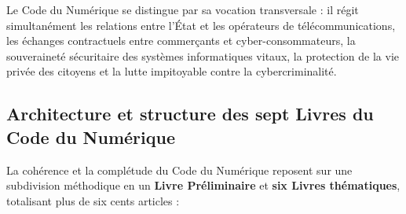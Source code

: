 Le Code du Numérique se distingue par sa vocation transversale : il régit simultanément les relations entre l'État et les opérateurs de télécommunications, les échanges contractuels entre commerçants et cyber-consommateurs, la souveraineté sécuritaire des systèmes informatiques vitaux, la protection de la vie privée des citoyens et la lutte impitoyable contre la cybercriminalité.

\subsection{Architecture et structure des sept Livres du Code du Numérique}

La cohérence et la complétude du Code du Numérique reposent sur une subdivision méthodique en un \textbf{Livre Préliminaire} et \textbf{six Livres thématiques}, totalisant plus de six cents articles :

